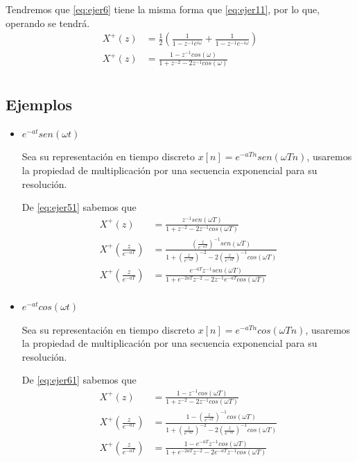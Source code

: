 \documentclass[12pt]{article}
\begin{document}
Tendremos que \ref{eq:ejer6} tiene la misma forma que \ref{eq:ejer11}, por lo que, operando se tendrá.
\begin{equation}
    \begin{split}
        X^+(z)&=\frac{1}{2}(\frac{1}{1-z^{-1}e^{i\omega}}+\frac{1}{1-z^{-1}e^{-i\omega}})\\
        X^+(z)&=\frac{1-z^{-1}cos(\omega)}{1+z^{-2}-2z^{-1}cos(\omega)}\\
    \end{split}
    \label{eq:ejer61}
\end{equation}

\subsection{Ejemplos}

\begin{itemize}
    \item \textbf{$e^{-at}sen(\omega t)$}
    \vspace{5mm}

Sea su representación en tiempo discreto $x[n]=e^{-aTn}sen(\omega Tn)$, usaremos la propiedad de multiplicación por una secuencia exponencial para su resolución.

De \ref{eq:ejer51} sabemos que 
\begin{equation}
    \begin{split}
        X^+(z)&=\frac{z^{-1}sen(\omega T)}{1+z^{-2}-2z^{-1}cos(\omega T)}\\
        X^+(\frac{z}{e^{-aT}})&=\frac{(\frac{z}{e^{-aT}})^{-1}sen(\omega T)}{1+(\frac{z}{e^{-aT}})^{-2}-2(\frac{z}{e^{-aT}})^{-1}cos(\omega T)}\\
        X^+(\frac{z}{e^{-aT}})&=\frac{e^{-aT}z^{-1}sen(\omega T)}{1+e^{-2aT}z^{-2}-2z^{-1}e^{-aT}cos(\omega T)}\\
    \end{split}
    \label{eq:ejer62}
\end{equation}

\item \textbf{$e^{-at}cos(\omega t)$}
    \vspace{5mm}

Sea su representación en tiempo discreto $x[n]=e^{-aTn}cos(\omega Tn)$, usaremos la propiedad de multiplicación por una secuencia exponencial para su resolución.

De \ref{eq:ejer61} sabemos que 
\begin{equation}
    \begin{split}
        X^+(z)&=\frac{1-z^{-1}cos(\omega T)}{1+z^{-2}-2z^{-1}cos(\omega T)}\\
        X^+(\frac{z}{e^{-aT}})&=\frac{1-(\frac{z}{e^{-aT}})^{-1}cos(\omega T)}{1+(\frac{z}{e^{-aT}})^{-2}-2(\frac{z}{e^{-aT}})^{-1}cos(\omega T)}\\
        X^+(\frac{z}{e^{-aT}})&=\frac{1-e^{-aT}z^{-1}cos(\omega T)}{1+e^{-2aT}z^{-2}-2e^{-aT}z^{-1}cos(\omega T)}\\
    \end{split}
    \label{eq:ejer72}
\end{equation}
\end{itemize}


\end{document}
